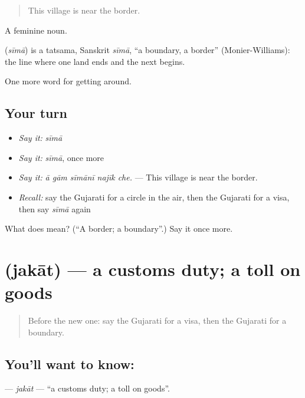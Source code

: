 \begin{quote}
This village is near the border.
\end{quote}

A feminine noun.

\begin{cousinweb}
\textbf{} (\emph{sīmā}) is a tatsama, Sanskrit \emph{sīmā}, \textquotedblleft{}a boundary, a border\textquotedblright{} (Monier-Williams): the line where one land ends and the next begins.
\end{cousinweb}

\begin{grammarlens}[title={What you've built}]
One more word for getting around.
\end{grammarlens}

\subsection*{Your turn}
\begin{itemize}
\raggedright
  \item \emph{Say it:} \emph{sīmā}
  \item \emph{Say it:} \emph{sīmā}, once more
  \item \emph{Say it:} \emph{ā gām sīmānī najīk che.} — This village is near the border.
  \item \emph{Recall:} say the Gujarati for a circle in the air, then the Gujarati for a visa, then say \emph{sīmā} again
\end{itemize}

\begin{tcolorbox}[breakable,colback=teal!4,colframe=teal!35!black,title={Before you move on}]
What does  mean? (\textquotedblleft{}A border; a boundary\textquotedblright{}.) Say it once more.
\end{tcolorbox}
\section[\texorpdfstring{\gu{જકાત} (jakāt)}{જકાત (jakāt)}]{ (jakāt) — a customs duty; a toll on goods}

\label{lesson:GU-C406-jakat}



\begin{quote}
Before the new one: say the Gujarati for a visa, then the Gujarati for a boundary.
\end{quote}

\subsection*{You'll want to know: }
\textbf{} — \emph{jakāt} — \textquotedblleft{}a customs duty; a toll on goods\textquotedblright{}.

